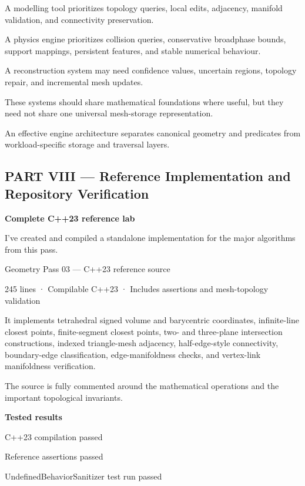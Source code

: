 A modelling tool prioritizes topology queries, local edits, adjacency, manifold validation, and connectivity preservation.

A physics engine prioritizes collision queries, conservative broadphase bounds, support mappings, persistent features, and stable numerical behaviour.

A reconstruction system may need confidence values, uncertain regions, topology repair, and incremental mesh updates.

These systems should share mathematical foundations where useful, but they need not share one universal mesh-storage representation.

An effective engine architecture separates canonical geometry and predicates from workload-specific storage and traversal layers.

\subsection{PART VIII --- Reference Implementation and Repository Verification}\label{04-visual-computing-ii-ch023-part-viii-reference-implementation-and-repository-verification}

\hypertarget{04-visual-computing-ii-ch023-part-viii-reference-implementation-and-repository-verification}{}

\textbf{Complete C++23 reference lab}

I've created and compiled a standalone implementation for the major algorithms from this pass.

Geometry Pass 03 --- C++23 reference source

245 lines · Compilable C++23 · Includes assertions and mesh-topology validation

It implements tetrahedral signed volume and barycentric coordinates, infinite-line closest points, finite-segment closest points, two- and three-plane intersection constructions, indexed triangle-mesh adjacency, half-edge-style connectivity, boundary-edge classification, edge-manifoldness checks, and vertex-link manifoldness verification.

The source is fully commented around the mathematical operations and the important topological invariants.

\textbf{Tested results}

C++23 compilation passed

Reference assertions passed

UndefinedBehaviorSanitizer test run passed

